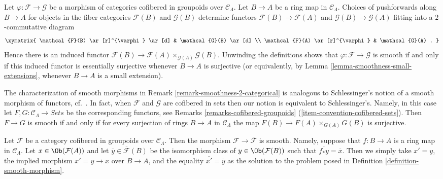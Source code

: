 \begin{remark}
\label{remark-smoothness-2-categorical}
Let $\varphi : \mathcal{F} \to \mathcal{G}$ be a morphism of categories
cofibered in groupoids over $\mathcal{C}_\Lambda$.  Let $B \to A$ be a
ring map in $\mathcal{C}_\Lambda$.  Choices of pushforwards along $B
\to A$ for objects in the fiber categories $\mathcal{F}(B)$ and
$\mathcal{G}(B)$ determine functors $\mathcal{F}(B) \to \mathcal{F}(A)$
and $\mathcal{G}(B) \to \mathcal{G}(A)$ fitting into a $2$-commutative
diagram
$$
\xymatrix{
\mathcal{F}(B) \ar[r]^{\varphi} \ar[d] & \mathcal{G}(B) \ar[d] \\
\mathcal{F}(A) \ar[r]^{\varphi}        & \mathcal{G}(A) .
}
$$
Hence there is an induced functor $\mathcal{F}(B) \to \mathcal{F}(A)
\times_{\mathcal{G}(A)} \mathcal{G}(B)$.  Unwinding the definitions shows that
$\varphi : \mathcal{F} \to \mathcal{G}$ is smooth if and only if this
induced functor is essentially surjective whenever $B \to A$ is
surjective (or equivalently, by
Lemma \ref{lemma-smoothness-small-extensions},
whenever $B \to A$ is a small extension).
\end{remark}

\begin{remark}
\label{remark-compare-smooth-schlessinger}
The characterization of smooth morphisms in
Remark \ref{remark-smoothness-2-categorical}
is analogous to Schlessinger's notion of
a smooth morphism of functors, cf.\ \cite[Definition 2.2.]{Sch}. In
fact, when $\mathcal{F}$ and $\mathcal{G}$ are cofibered in sets
then our notion is equivalent to Schlessinger's. Namely, in this case
let $F, G : \mathcal{C}_\Lambda \to \textit{Sets}$ be the corresponding
functors, see
Remarks \ref{remarks-cofibered-groupoids}
(\ref{item-convention-cofibered-sets}).
Then $F \to G$ is smooth if and only if for every surjection of rings
$B \to A$ in $\mathcal{C}_\Lambda$ the map $F(B) \to F(A) \times_{G(A)} G(B)$
is surjective.
\end{remark}

\begin{remark}
\label{remark-smooth-to-iso-classes}
Let $\mathcal{F}$ be a category cofibered in groupoids over
$\mathcal{C}_\Lambda$. Then the morphism
$\mathcal{F} \to \overline{\mathcal{F}}$ is smooth.
Namely, suppose that $f : B \to A$ is a ring map in $\mathcal{C}_\Lambda$.
Let $x \in \Ob(\mathcal{F}(A))$ and let
$\overline{y} \in \overline{\mathcal{F}}(B)$
be the isomorphism class of $y \in \Ob(\mathcal{F}(B))$ such that
$\overline{f_*y} = \overline{x}$. Then we simply take $x' = y$, the
implied morphism $x' = y \to x$ over $B \to A$, and the equality
$\overline{x'} = \overline{y}$ as the solution to
the problem posed in Definition \ref{definition-smooth-morphism}.
\end{remark}

